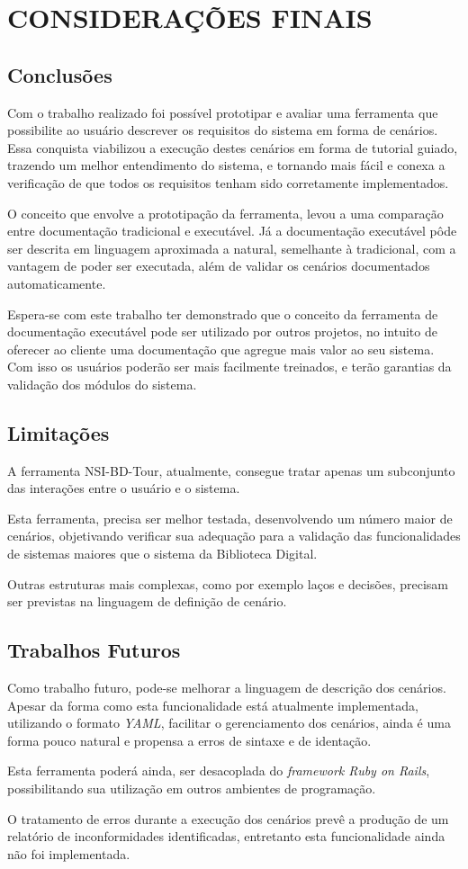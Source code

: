 \chapter{CONSIDERAÇÕES FINAIS}

\section{Conclusões}

Com o trabalho realizado foi possível prototipar e avaliar uma ferramenta que possibilite ao usuário descrever os requisitos do sistema em forma de cenários. Essa conquista viabilizou a execução destes cenários em forma de tutorial guiado, trazendo um melhor entendimento do sistema, e tornando mais fácil e conexa a verificação de que todos os requisitos tenham sido corretamente implementados.

O conceito que envolve a prototipação da ferramenta, levou a uma comparação entre documentação tradicional e executável. Já a documentação executável pôde ser descrita em linguagem aproximada a natural, semelhante à tradicional, com a vantagem de poder ser executada, além de validar os cenários documentados automaticamente.

Espera-se com este trabalho ter demonstrado que o conceito da ferramenta de documentação executável pode ser utilizado por outros projetos, no intuito de oferecer ao cliente uma documentação que agregue mais valor ao seu sistema. Com isso os usuários poderão ser mais facilmente treinados, e terão garantias da validação dos módulos do sistema.

\section{Limitações}

A ferramenta NSI-BD-Tour, atualmente, consegue tratar apenas um subconjunto das interações entre o usuário e o sistema.

Esta ferramenta, precisa ser melhor testada, desenvolvendo um número maior de cenários, objetivando verificar sua adequação para a validação das funcionalidades de sistemas maiores que o sistema da Biblioteca Digital.

Outras estruturas mais complexas, como por exemplo laços e decisões, precisam ser previstas na linguagem de definição de cenário.

\section{Trabalhos Futuros}

Como trabalho futuro, pode-se melhorar a linguagem de descrição dos cenários. Apesar da forma como esta funcionalidade está atualmente implementada, utilizando o formato \textit{YAML}, facilitar o gerenciamento dos cenários, ainda é uma forma pouco natural e propensa a erros de sintaxe e de identação.

Esta ferramenta poderá ainda, ser desacoplada do \textit{framework Ruby on Rails}, possibilitando sua utilização em outros ambientes de programação.

O tratamento de erros durante a execução dos cenários prevê a produção de um relatório de inconformidades identificadas, entretanto esta funcionalidade ainda não foi implementada.